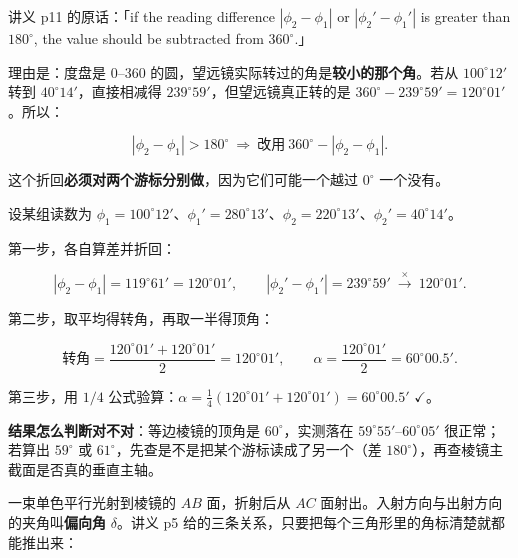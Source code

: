 \documentclass[11pt]{ctexart}
\begin{document}


讲义 p11 的原话：「if the reading difference $|\phi_2-\phi_1|$ or $|\phi_2'-\phi_1'|$ is greater than $180^{\circ}$, the value should be subtracted from $360^{\circ}$.」

理由是：度盘是 $0$--$360$ 的圆，望远镜实际转过的角是\textbf{较小的那个角}。若从 $100^{\circ}12'$ 转到 $40^{\circ}14'$，直接相减得 $239^{\circ}59'$，但望远镜真正转的是 $360^{\circ}-239^{\circ}59'=120^{\circ}01'$。所以：

\[
|\phi_2-\phi_1|>180^{\circ}\ \Longrightarrow\ \text{改用}\ 360^{\circ}-|\phi_2-\phi_1| .
\]

这个折回\textbf{必须对两个游标分别做}，因为它们可能一个越过 $0^{\circ}$ 一个没有。


设某组读数为 $\phi_1=100^{\circ}12'$、$\phi_1'=280^{\circ}13'$、$\phi_2=220^{\circ}13'$、$\phi_2'=40^{\circ}14'$。

第一步，各自算差并折回：

\[
|\phi_2-\phi_1|=119^{\circ}61'=120^{\circ}01',\qquad
|\phi_2'-\phi_1'|=239^{\circ}59'\ \xrightarrow{\ \times\ }\ 120^{\circ}01'.
\]

第二步，取平均得转角，再取一半得顶角：

\[
\text{转角}=\frac{120^{\circ}01'+120^{\circ}01'}{2}=120^{\circ}01',
\qquad
\alpha=\frac{120^{\circ}01'}{2}=60^{\circ}00.5'.
\]

第三步，用 $1/4$ 公式验算：$\alpha=\tfrac14(120^{\circ}01'+120^{\circ}01')=60^{\circ}00.5'$ $\checkmark$。

\textbf{结果怎么判断对不对}：等边棱镜的顶角是 $60^{\circ}$，实测落在 $59^{\circ}55'$--$60^{\circ}05'$ 很正常；若算出 $59^{\circ}$ 或 $61^{\circ}$，先查是不是把某个游标读成了另一个（差 $180^{\circ}$），再查棱镜主截面是否真的垂直主轴。





一束单色平行光射到棱镜的 $AB$ 面，折射后从 $AC$ 面射出。入射方向与出射方向的夹角叫\textbf{偏向角} $\delta$。讲义 p5 给的三条关系，只要把每个三角形里的角标清楚就都能推出来：
\end{document}
